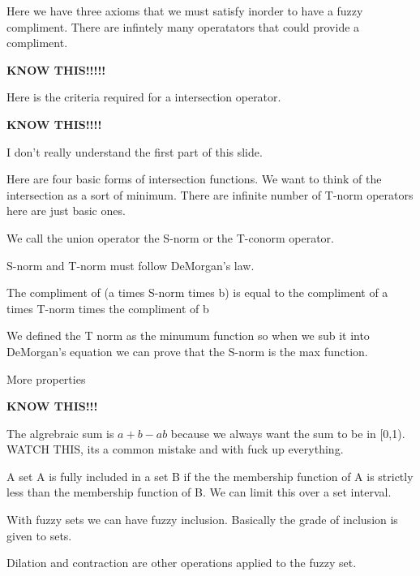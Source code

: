 \documentclass{article}
\begin{document}





Here we have three axioms that we must satisfy inorder to have a fuzzy compliment. There are infintely many operatators that could provide a compliment.

\textbf{KNOW THIS!!!!!}



Here is the criteria required for a intersection operator.

\textbf{KNOW THIS!!!!}


I don't really understand the first part of this slide.

Here are four basic forms of intersection functions. We want to think of the intersection as a sort of minimum. There are infinite number of T-norm operators here are just basic ones.



We call the union operator the S-norm or the T-conorm operator.

S-norm and T-norm must follow DeMorgan's law.

The compliment of (a times S-norm times b) is equal to the compliment of a times T-norm times the compliment of b


We defined the T norm as the minumum function so when we sub it into DeMorgan's equation we can prove that the S-norm is the max function.



More properties

\textbf{KNOW THIS!!!}


The algrebraic sum is $a+b-ab$ because we always want the sum to be in [0,1). WATCH THIS, its a common mistake and with fuck up everything.



A set A is fully included in a set B if the the membership function of A is strictly less than the membership function of B. We can limit this over a set interval.


With fuzzy sets we can have fuzzy inclusion. Basically the grade of inclusion is given to sets.




Dilation and contraction are other operations applied to the fuzzy set.
\end{document}
